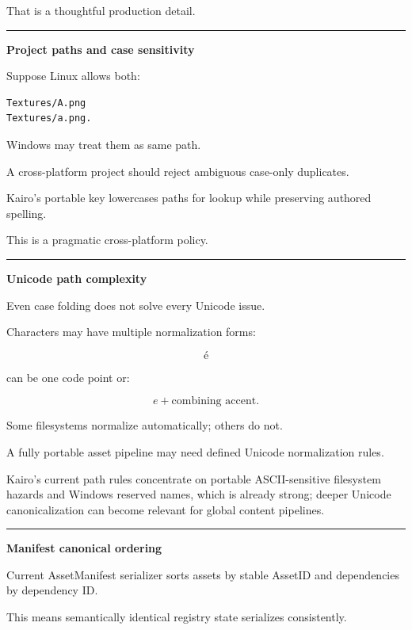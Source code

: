 That is a thoughtful production detail.

\begin{center}\rule{0.5\linewidth}{0.5pt}\end{center}

\textbf{Project paths and case sensitivity}

Suppose Linux allows both:

\begin{verbatim}
Textures/A.png
Textures/a.png.
\end{verbatim}

Windows may treat them as same path.

A cross-platform project should reject ambiguous case-only duplicates.

Kairo's portable key lowercases paths for lookup while preserving authored spelling.

This is a pragmatic cross-platform policy.

\begin{center}\rule{0.5\linewidth}{0.5pt}\end{center}

\textbf{Unicode path complexity}

Even case folding does not solve every Unicode issue.

Characters may have multiple normalization forms:

\[
é
\]

can be one code point or:

\[
e+\text{combining accent}.
\]

Some filesystems normalize automatically; others do not.

A fully portable asset pipeline may need defined Unicode normalization rules.

Kairo's current path rules concentrate on portable ASCII-sensitive filesystem hazards and Windows reserved names, which is already strong; deeper Unicode canonicalization can become relevant for global content pipelines.

\begin{center}\rule{0.5\linewidth}{0.5pt}\end{center}

\textbf{Manifest canonical ordering}

Current AssetManifest serializer sorts assets by stable AssetID and dependencies by dependency ID.

This means semantically identical registry state serializes consistently.

